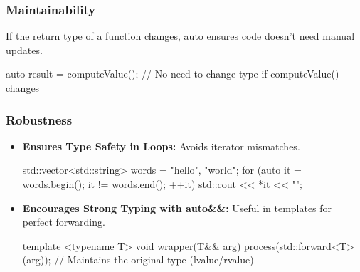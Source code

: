 \documentclass{report}
\begin{document}
 \bigbreak \noindent 
 \subsubsection{Maintainability}
 \bigbreak \noindent 
 If the return type of a function changes, auto ensures code doesn't need manual updates.
 \bigbreak \noindent 
 \begin{cppcode}
 auto result = computeValue(); // No need to change type if computeValue() changes
 \end{cppcode}
 \bigbreak \noindent 
 \subsubsection{Robustness}
 \bigbreak \noindent 
 \begin{itemize}
     \item \textbf{Ensures Type Safety in Loops:} Avoids iterator mismatches.
         \bigbreak \noindent 
         \begin{cppcode}
             std::vector<std::string> words = {"hello", "world"};
             for (auto it = words.begin(); it != words.end(); ++it) {
                 std::cout << *it << "\n";
             }
         \end{cppcode}
         \item \textbf{Encourages Strong Typing with auto\&\&:} Useful in templates for perfect forwarding.
             \bigbreak \noindent 
             \begin{cppcode}
                 template <typename T>
                 void wrapper(T&& arg) {
                     process(std::forward<T>(arg)); // Maintains the original type (lvalue/rvalue)
                 }
             \end{cppcode}
 \end{itemize}

 \bigbreak \noindent 
\end{document}

